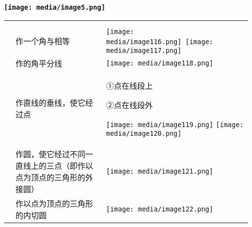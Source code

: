 \documentclass[a4paper,11pt,UTF8]{ctexart}
\begin{document}
\hypertarget{ux5b66ux79d1ux7f51www.zxxk.com--ux6559ux80b2ux8d44ux6e90ux95e8ux6237ux63d0ux4f9bux8bd5ux9898ux8bd5ux5377ux6559ux6848ux8bfeux4ef6ux6559ux5b66ux8bbaux6587ux7d20ux6750ux7b49ux5404ux7c7bux6559ux5b66ux8d44ux6e90ux5e93ux4e0bux8f7dux8fd8ux6709ux5927ux91cfux4e30ux5bccux7684ux6559ux5b66ux8d44ux8baf-24}{%
\subsubsection{\texorpdfstring{\protect\texttt{[image: media/image5.png]}}{学科网(www.zxxk.com)-\/-教育资源门户，提供试题试卷、教案、课件、教学论文、素材等各类教学资源库下载，还有大量丰富的教学资讯！}}\label{ux5b66ux79d1ux7f51www.zxxk.com--ux6559ux80b2ux8d44ux6e90ux95e8ux6237ux63d0ux4f9bux8bd5ux9898ux8bd5ux5377ux6559ux6848ux8bfeux4ef6ux6559ux5b66ux8bbaux6587ux7d20ux6750ux7b49ux5404ux7c7bux6559ux5b66ux8d44ux6e90ux5e93ux4e0bux8f7dux8fd8ux6709ux5927ux91cfux4e30ux5bccux7684ux6559ux5b66ux8d44ux8baf-24}}

\begin{longtable}[]{@{}lll@{}}
\toprule
\endhead
& &\tabularnewline
& &\tabularnewline
& 作一个角与相等 &
\texttt{[image: media/image116.png]}~\texttt{[image: media/image117.png]}\tabularnewline
& 作的角平分线 &
\texttt{[image: media/image118.png]}\tabularnewline
\begin{minipage}[t]{0.30\columnwidth}\raggedright
\strut
\end{minipage} & \begin{minipage}[t]{0.30\columnwidth}\raggedright
作直线的垂线，使它经过点\strut
\end{minipage} & \begin{minipage}[t]{0.30\columnwidth}\raggedright
①点在线段上~~~~~

②点在线段外

\texttt{[image: media/image119.png]}
\texttt{[image: media/image120.png]}\strut
\end{minipage}\tabularnewline
& 作圆，使它经过不同一直线上的三点（即作以点为顶点的三角形的外接圆） &
\texttt{[image: media/image121.png]}\tabularnewline
& 作以点为顶点的三角形的内切圆 &
\texttt{[image: media/image122.png]}\tabularnewline
\bottomrule
\end{longtable}

\hypertarget{section-20}{%
\subsubsection{}\label{section-20}}
\end{document}
